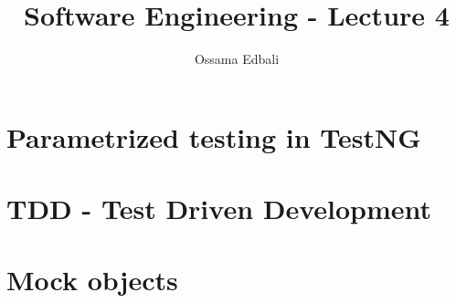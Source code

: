 \documentclass{article}
\title{Software Engineering - Lecture 4}
\author{Ossama Edbali}
\begin{document}
	
	\maketitle	
	
	\section{Parametrized testing in TestNG}	
		
	
	\section{TDD - Test Driven Development}
	
	\section{Mock objects}
	
\end{document}

